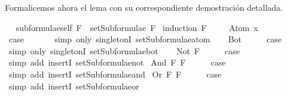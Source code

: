 \begin{isabellebody}
\begin{isamarkuptext}
  Formalicemos ahora el lema con su correspondiente demostración detallada.%
\end{isamarkuptext}\isamarkuptrue%
\ \isanewline
{}\isamarkupfalse%
\ subformulae{\isacharunderscore}self{\isacharcolon}\ {\isachardoublequoteopen}F\ {\isasymin}\ setSubformulae\ F{\isachardoublequoteclose}\isanewline
%
\isadelimproof
%
\endisadelimproof
%
\isatagproof
{}\isamarkupfalse%
\ {\isacharparenleft}induction\ F{\isacharparenright}\ \isanewline
\ \ \isamarkupfalse%
\ {\isacharparenleft}Atom\ x{\isacharparenright}\ \isanewline
\ \ \isamarkupfalse%
\ \isamarkupfalse%
\ {\isacharquery}case\ \isanewline
\ \ \ \ \isamarkupfalse%
\ {\isacharparenleft}simp\ only{\isacharcolon}\ singletonI\ setSubformulae{\isacharunderscore}atom{\isacharparenright}\isanewline
{}\isamarkupfalse%
\isanewline
\ \ \isamarkupfalse%
\ Bot\isanewline
\ \ \isamarkupfalse%
\ \isamarkupfalse%
\ {\isacharquery}case\ \isanewline
\ \ \ \ \isamarkupfalse%
\ {\isacharparenleft}simp\ only{\isacharcolon}\ singletonI\ setSubformulae{\isacharunderscore}bot{\isacharparenright}\isanewline
{}\isamarkupfalse%
\isanewline
\ \ \isamarkupfalse%
\ {\isacharparenleft}Not\ F{\isacharparenright}\isanewline
\ \ \isamarkupfalse%
\ \isamarkupfalse%
\ {\isacharquery}case\ \isanewline
\ \ \ \ \isamarkupfalse%
\ {\isacharparenleft}simp\ add{\isacharcolon}\ insertI{}\ setSubformulae{\isacharunderscore}not{\isacharparenright}\isanewline
{}\isamarkupfalse%
\isanewline
{}\isamarkupfalse%
\ {\isacharparenleft}And\ F{}\ F{}{\isacharparenright}\isanewline
\ \ \isamarkupfalse%
\ \isamarkupfalse%
\ {\isacharquery}case\ \isanewline
\ \ \ \ \isamarkupfalse%
\ {\isacharparenleft}simp\ add{\isacharcolon}\ insertI{}\ setSubformulae{\isacharunderscore}and{\isacharparenright}\isanewline
{}\isamarkupfalse%
\isanewline
{}\isamarkupfalse%
\ {\isacharparenleft}Or\ F{}\ F{}{\isacharparenright}\isanewline
\ \ \isamarkupfalse%
\ \isamarkupfalse%
\ {\isacharquery}case\ \isanewline
\ \ \ \ \isamarkupfalse%
\ {\isacharparenleft}simp\ add{\isacharcolon}\ insertI{}\ setSubformulae{\isacharunderscore}or{\isacharparenright}\isanewline

\end{isabellebody}
